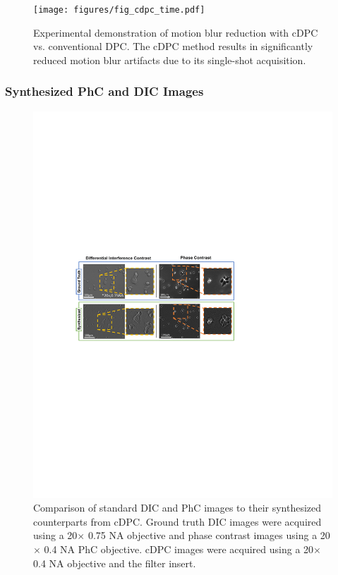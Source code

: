 \begin{figure}[tbh]
\centering
\texttt{[image: figures/fig\_cdpc\_time.pdf]}
\caption{\label{fig:temporalRes}
Experimental demonstration of motion blur reduction with cDPC vs. conventional DPC. The cDPC method results in significantly reduced motion blur artifacts due to its single-shot acquisition.}
\end{figure}

\subsubsection{Synthesized PhC and DIC Images}

\begin{figure}[tbh]
\centering
\includegraphics[width=\textwidth]{figures/fig_cdpc_dic.pdf}
\caption{\label{fig:synthDIC_PC}
Comparison of standard DIC and PhC images to their synthesized counterparts from cDPC. Ground truth DIC images were acquired using a 20$\times$ 0.75 NA objective and phase contrast images using a 20$\times$ 0.4 NA PhC objective. cDPC images were acquired using a 20$\times$ 0.4 NA objective and the filter insert.}\end{figure}

